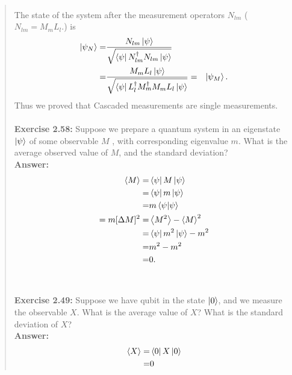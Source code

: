 \documentclass[UTF8]{ctexart}
\begin{document}
\begin{quote}
\begin{equation}
\begin{aligned}
			\end{aligned}
		\end{equation}
		The state of the system after the measurement operators ${N_{lm}}$ ($N_{lm} = M_{m}L_{l}.$) is
		\begin{equation}
			\begin{aligned}
				\ket{\psi_{N}}=&\frac{N_{lm}\ket{\psi}}{\sqrt{\bra{\psi}N_{lm}^{\dagger}N_{lm}\ket{\psi}}} \\
							  =&\frac{M_{m}L_{l}\ket{\psi}}{\sqrt{\bra{\psi}L_{l}^{\dagger}M_{m}^{\dagger}M_{m}L_{l}\ket{\psi}}}
							  =&\ket{\psi_{M}}.
			\end{aligned}
		\end{equation} 
		Thus we proved that Cascaded measurements are single measurements.
	\\
\\
\textbf{Exercise 2.58: } Suppose we prepare a quantum system in an eigenstate
 $ \ket{\psi}$ of some observable $M$ , with corresponding eigenvalue $m$. 
 What is the average observed value of $M$, and the standard deviation?
 \\
\textbf{Answer:}\\
\begin{equation}
	\begin{aligned}
		\left \langle M\right\rangle=&\bra{\psi}M\ket{\psi}\\
									=&\bra{\psi}m\ket{\psi} \\
									=&m\bra{\psi}\ket{\psi} \\
									=m
		[\Delta M]^{2}=&\left \langle M^{2}\right\rangle-\left \langle M\right\rangle^{2}\\
					  =&\bra{\psi}m^{2}\ket{\psi}-m^{2} \\
					  =&m^{2}-m^{2} \\
					  =&0.
	\end{aligned}
\end{equation} 
\\
\\
\textbf{Exercise 2.49: } Suppose we have qubit in the state $\ket{0}$, and we measure the observable $X$. 
What is the average value of $X$? What is the standard deviation of $X$?
\\
\textbf{Answer:}\\
\begin{equation}
	\begin{aligned}
		\left \langle X\right\rangle=&\bra{0}X\ket{0} \\
									=&0\\

\end{aligned}
\end{equation}
\end{quote}
\end{document}
